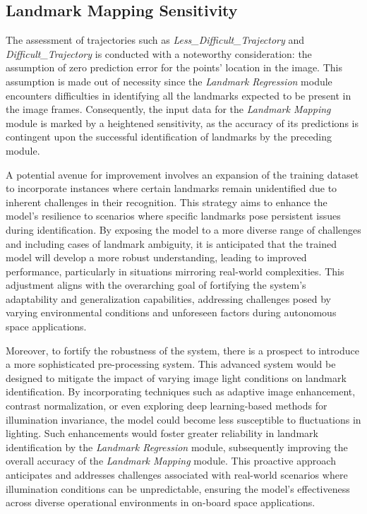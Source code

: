 \subsection{Landmark Mapping Sensitivity}
The assessment of trajectories such as \textit{Less\_Difficult\_Trajectory} and \textit{Difficult\_Trajectory} is conducted with a noteworthy consideration: the assumption of zero prediction error for the points' location in the image. This assumption is made out of necessity since the \textit{Landmark Regression} module encounters difficulties in identifying all the landmarks expected to be present in the image frames. Consequently, the input data for the \textit{Landmark Mapping} module is marked by a heightened sensitivity, as the accuracy of its predictions is contingent upon the successful identification of landmarks by the preceding module.

A potential avenue for improvement involves an expansion of the training dataset to incorporate instances where certain landmarks remain unidentified due to inherent challenges in their recognition. This strategy aims to enhance the model's resilience to scenarios where specific landmarks pose persistent issues during identification. By exposing the model to a more diverse range of challenges and including cases of landmark ambiguity, it is anticipated that the trained model will develop a more robust understanding, leading to improved performance, particularly in situations mirroring real-world complexities. This adjustment aligns with the overarching goal of fortifying the system's adaptability and generalization capabilities, addressing challenges posed by varying environmental conditions and unforeseen factors during autonomous space applications.

Moreover, to fortify the robustness of the system, there is a prospect to introduce a more sophisticated pre-processing system. This advanced system would be designed to mitigate the impact of varying image light conditions on landmark identification. By incorporating techniques such as adaptive image enhancement, contrast normalization, or even exploring deep learning-based methods for illumination invariance, the model could become less susceptible to fluctuations in lighting. Such enhancements would foster greater reliability in landmark identification by the \textit{Landmark Regression} module, subsequently improving the overall accuracy of the \textit{Landmark Mapping} module. This proactive approach anticipates and addresses challenges associated with real-world scenarios where illumination conditions can be unpredictable, ensuring the model's effectiveness across diverse operational environments in on-board space applications.

